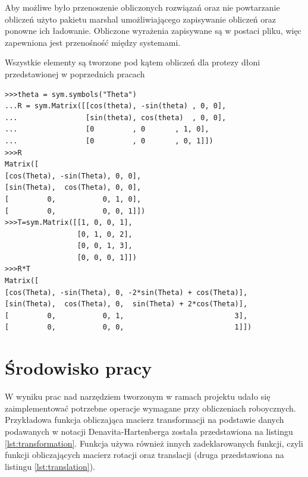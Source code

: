 \documentclass[polish,polish]{article}
\begin{document}
Aby możliwe było przenoszenie obliczonych rozwiązań oraz nie powtarzanie obliczeń użyto pakietu marshal umożliwiającego zapisywanie obliczeń oraz ponowne ich ładowanie. Obliczone wyrażenia zapisywane są w postaci pliku, więc zapewniona jest przenośność między systemami.

Wszystkie elementy są tworzone pod kątem obliczeń dla protezy dłoni przedstawionej w poprzednich pracach \cite{wolczowski2016control}



\begin{lstlisting}[caption={Przykład pracy w środowisku sympy},
     label={lst:sympy}
     ]
>>>theta = sym.symbols("Theta")
...R = sym.Matrix([[cos(theta), -sin(theta)	, 0, 0],
...                [sin(theta), cos(theta)	, 0, 0],
...                [0		  , 0		, 1, 0],
...                [0		  , 0		, 0, 1]])
>>>R
Matrix([
[cos(Theta), -sin(Theta), 0, 0],
[sin(Theta),  cos(Theta), 0, 0],
[         0,           0, 1, 0],
[         0,           0, 0, 1]])
>>>T=sym.Matrix([[1, 0, 0, 1],
              	 [0, 1, 0, 2],
              	 [0, 0, 1, 3],
              	 [0, 0, 0, 1]])
>>>R*T
Matrix([
[cos(Theta), -sin(Theta), 0, -2*sin(Theta) + cos(Theta)],
[sin(Theta),  cos(Theta), 0,  sin(Theta) + 2*cos(Theta)],
[         0,           0, 1,                          3],
[         0,           0, 0,                          1]])
\end{lstlisting}


\newpage
\section{Środowisko pracy}
W wyniku prac nad narzędziem tworzonym w ramach projektu udało się zaimplementować potrzebne operacje wymagane przy obliczeniach roboycznych. Przykładowa funkcja obliczająca macierz transformacji na podstawie danych podawanych w notacji Denavita-Hartenberga została przedstawiona na listingu \ref{lst:transformation}. Funkcja używa również innych zadeklarowanych funkcji, czyli funkcji obliczających macierz rotacji oraz translacji (druga przedstawiona na listingu \ref{lst:translation}).
\end{document}
